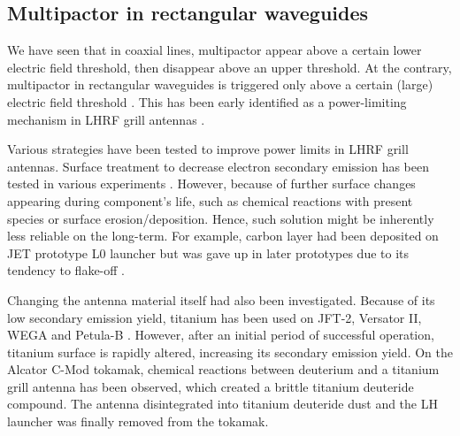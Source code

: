 \subsection{Multipactor in rectangular waveguides}\label{sec:multipactor_lhrf}




We have seen that in coaxial lines, multipactor appear above a certain lower electric field threshold, then disappear above an upper threshold. At the contrary, multipactor in rectangular waveguides is triggered only above a certain (large) electric field threshold . This has been early identified as a power-limiting mechanism in LHRF grill antennas . 


Various strategies have been tested to improve power limits in LHRF grill antennas. Surface treatment to decrease electron secondary emission has been tested in various experiments . However, because of further surface changes appearing during component's life, such as chemical reactions with present species or surface erosion/deposition. Hence, such solution might be inherently less reliable on the long-term. For example, carbon layer had been deposited on JET prototype L0 launcher but was gave up in later prototypes due to its tendency to flake-off .

Changing the antenna material itself had also been investigated. Because of its low secondary emission yield, titanium has been used on JFT-2, Versator II, WEGA and Petula-B . However, after an initial period of successful operation, titanium surface is rapidly altered, increasing its secondary emission yield. On the Alcator C-Mod tokamak, chemical reactions between deuterium and a titanium grill antenna has been observed, which created a brittle titanium deuteride compound. The antenna disintegrated into titanium deuteride dust and the LH launcher was finally removed from the tokamak\cite{wallace2010}. 

